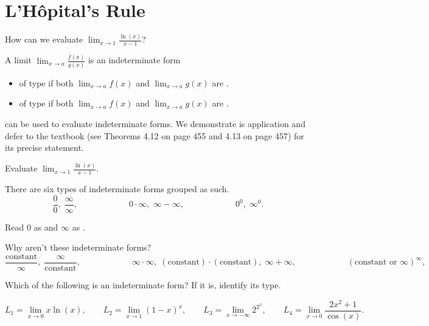 \documentclass[../main.tex]{subfiles}
\begin{document}
 \section{L'H\^opital's Rule}
  How can we evaluate \(\lim_{x \to 1} \frac{\ln(x)}{x - 1}\)?

  A limit \(\lim_{x \to a} \frac{f(x)}{g(x)}\) is an indeterminate form 
  \begin{itemize}
    \item of type \underline{\hspace{1in}} if both \(\lim_{x \to a} f(x)\) and \(\lim_{x \to a} g(x)\) are \underline{\hspace{1in}}.
    \item of type \underline{\hspace{1in}} if both \(\lim_{x \to a} f(x)\) and \(\lim_{x \to a} g(x)\) are \underline{\hspace{1in}}.
  \end{itemize}
   can be used to evaluate indeterminate forms. We demonstrate is application and defer to the textbook (see Theorems 4.12 on page 455 and 4.13 on page 457) for its precise statement.
  
  \begin{example}
    Evaluate \(\lim_{x \to 1} \frac{\ln(x)}{x - 1}\).
  \end{example}

  There are six types of indeterminate forms grouped as such.
  \[
    \frac{0}{0},\; \frac{\infty}{\infty}, \hspace{1in} 0 \cdot \infty,\; \infty - \infty, \hspace{1in} 0^{0}, \; \infty^{0}.
  \]

  Read \(0\) as \underline{\hspace{3in}} and \(\infty\) as \underline{\hspace{3in}}. 

  Why aren't these indeterminate forms?
  \[
    \frac{\text{constant}}{\infty},\; \frac{\infty}{\text{constant}}, \hspace{1in} \infty \cdot \infty,\; (\text{constant}) \cdot (\text{constant}),\; \infty + \infty, \hspace{1in} (\text{constant} \text{ or } \infty)^{\infty}, 
  \]
  
  \begin{example}
    Which of the following is an indeterminate form? If it is, identify its type. 

    \[
      L_{1} = \lim_{x \to 0} x \ln(x),
      \qquad
      L_{2} = \lim_{x \to 1} (1-x)^{x},
      \qquad
      L_{3} = \lim_{x \to -\infty} 2^{2^{x}},
      \qquad
      L_{4} = \lim_{x \to 0} \frac{2x^{2}+1}{\cos(x)}.
    \]
  \end{example}
\end{document}
